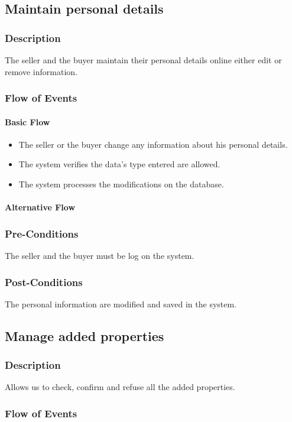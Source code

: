 \documentclass[a4paper,12pt]{article}
\begin{document}
\subsection{Maintain personal details}
\subsubsection{Description}
The seller and the buyer maintain their personal details online either edit or remove information.
\subsubsection{Flow of Events}
\paragraph{Basic Flow}
\begin{itemize}
\item The seller or the buyer change any information about his personal details.
\item The system verifies the data's type entered are allowed.
\item The system processes the modifications on the database.
\end{itemize}
\paragraph{Alternative Flow}
\begin{itemize}
\end{itemize}
\subsubsection{Pre-Conditions}
The seller and the buyer must be log on the system.
\subsubsection{Post-Conditions}
The personal information are modified and saved in the system.

\subsection{Manage added properties}
\subsubsection{Description}
Allows us to check, confirm and refuse all the added properties.
\subsubsection{Flow of Events}
\end{document}
